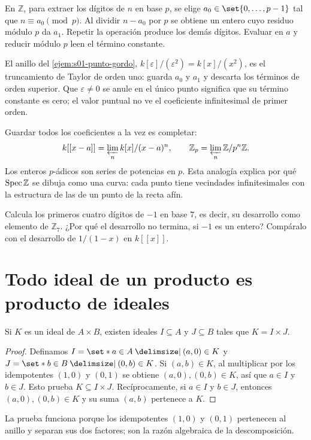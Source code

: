 En $\mathbb Z$, para extraer los dígitos de $n$ en base $p$, se elige $a_0\in\set{0,\ldots,p-1}$ tal que $n\equiv a_0\pmod p$. Al dividir $n-a_0$ por $p$ se obtiene un entero cuyo residuo módulo $p$ da $a_1$. Repetir la operación produce los demás dígitos. Evaluar en $a$ y reducir módulo $p$ leen el término constante.

\begin{obs}
\label{obs:s01-punto-gordo-releido}
El anillo del \cref{ejem:s01-punto-gordo}, $k[\varepsilon]/(\varepsilon^2)=k[x]/(x^2)$, es el truncamiento de Taylor de orden uno: guarda $a_0$ y $a_1$ y descarta los términos de orden superior. Que $\varepsilon\ne0$ se anule en el único punto significa que su término constante es cero; el valor puntual no ve el coeficiente infinitesimal de primer orden.
\end{obs}

\begin{obs}
\label{obs:s01-completar-misma-operacion-dos-lados}
Guardar todos los coeficientes a la vez es completar:
\[
k[[x-a]]=\varprojlim_n k[x]/(x-a)^n,\qquad
\mathbb Z_p=\varprojlim_n\mathbb Z/p^n\mathbb Z.
\]
Los enteros $p$-ádicos son series de potencias en $p$. Esta analogía explica por qué $\operatorname{Spec}\mathbb Z$ se dibuja como una curva: cada punto tiene vecindades infinitesimales con la estructura de las de un punto de la recta afín.
\end{obs}

\begin{ejer}
\label{ejer:s01-calcula-primeros-cuatro-digitos-1}
Calcula los primeros cuatro dígitos de $-1$ en base $7$, es decir, su desarrollo como elemento de $\mathbb Z_7$. ¿Por qué el desarrollo no termina, si $-1$ es un entero? Compáralo con el desarrollo de $1/(1-x)$ en $k[[x]]$.
\end{ejer}

\section{Todo ideal de un producto es producto de ideales}

\begin{prop}
\label{prop:s01-k-ideal-b-existen-ideales}
Si $K$ es un ideal de $A\times B$, existen ideales $I\subseteq A$ y $J\subseteq B$ tales que $K=I\times J$.
\end{prop}
\begin{proof}
Definamos $I=\set*{a\in A \given (a,0)\in K}$ y $J=\set*{b\in B \given (0,b)\in K}$. Si $(a,b)\in K$, al multiplicar por los idempotentes $(1,0)$ y $(0,1)$ se obtiene $(a,0),(0,b)\in K$, así que $a\in I$ y $b\in J$. Esto prueba $K\subseteq I\times J$. Recíprocamente, si $a\in I$ y $b\in J$, entonces $(a,0),(0,b)\in K$ y su suma $(a,b)$ pertenece a $K$.
\end{proof}
\begin{obs}
\label{obs:s01-prueba-funciona-porque-idempotentes-1}
La prueba funciona porque los idempotentes $(1,0)$ y $(0,1)$ pertenecen al anillo y separan sus dos factores; son la razón algebraica de la descomposición.
\end{obs}

